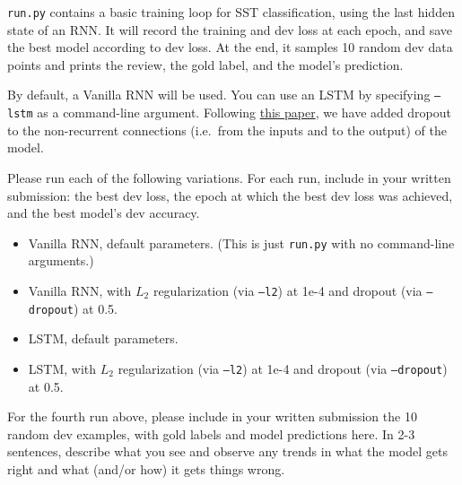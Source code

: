 \documentclass[11pt]{article}
\begin{document}
\texttt{run.py} contains a basic training loop for SST classification, using the last hidden state of an RNN. It will record the training and dev loss at each epoch, and save the best model according to dev loss.  At the end, it samples 10 random dev data points and prints the review, the gold label, and the model's prediction.

\vspace{2em}
 By default, a Vanilla RNN will be used.  You can use an LSTM by specifying \texttt{--lstm} as a command-line argument.  Following \href{https://arxiv.org/abs/1409.2329}{this paper}, we have added dropout to the non-recurrent connections (i.e.\ from the inputs and to the output) of the model.

\noindent Please run each of the following variations.  For each run, include in your written submission: the best dev loss, the epoch at which the best dev loss was achieved, and the best model's dev accuracy.
\begin{itemize}
  \item Vanilla RNN, default parameters.  (This is just \texttt{run.py} with no command-line arguments.)
  \item Vanilla RNN, with $L_2$ regularization (via \texttt{--l2}) at 1e-4 and dropout (via \texttt{--dropout}) at 0.5.
  \item LSTM, default parameters. 
  \item LSTM, with $L_2$ regularization (via \texttt{--l2}) at 1e-4 and dropout (via \texttt{--dropout}) at 0.5.
\end{itemize}

\vspace{2em}
 For the fourth run above, please include in your written submission the 10 random dev examples, with gold labels and model predictions here.  In 2-3 sentences, describe what you see and observe any trends in what the model gets right and what (and/or how) it gets things wrong.
\end{document}
